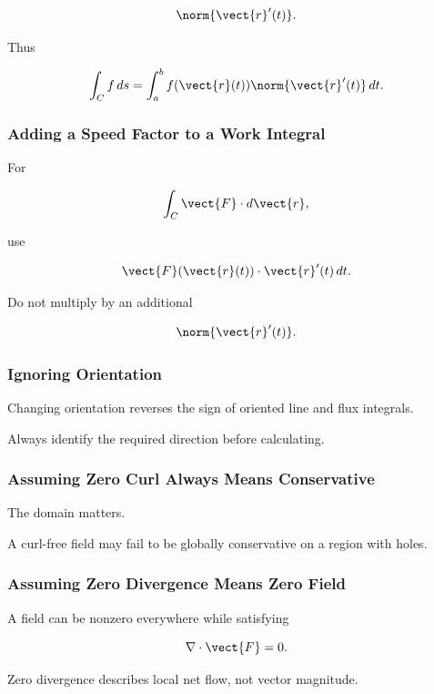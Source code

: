 \[ \norm{\vect{r}'(t)}. \]

Thus

\[ \int_Cf\,ds
=
\int_a^bf(\vect{r}(t))
\norm{\vect{r}'(t)}\,dt. \]

\subsubsection{Adding a Speed Factor to a Work Integral}

For

\[ \int_C\vect{F}\cdot d\vect{r}, \]

use

\[ \vect{F}(\vect{r}(t))\cdot\vect{r}'(t)\,dt. \]

Do not multiply by an additional

\[ \norm{\vect{r}'(t)}. \]

\subsubsection{Ignoring Orientation}

Changing orientation reverses the sign of oriented line and flux integrals.

Always identify the required direction before calculating.

\subsubsection{Assuming Zero Curl Always Means Conservative}

The domain matters.

A curl-free field may fail to be globally conservative on a region with
holes.

\subsubsection{Assuming Zero Divergence Means Zero Field}

A field can be nonzero everywhere while satisfying

\[ \nabla\cdot\vect{F}=0. \]

Zero divergence describes local net flow, not vector magnitude.


